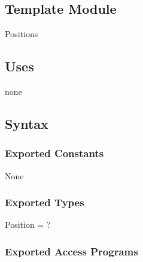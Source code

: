 \documentclass[12pt]{article}
\begin{document}
\subsection*{Template Module}

Positions

\subsection* {Uses}

none

\subsection* {Syntax}

\subsubsection* {Exported Constants}

None

\subsubsection* {Exported Types}

Position = ?

\subsubsection* {Exported Access Programs}
\end{document}
